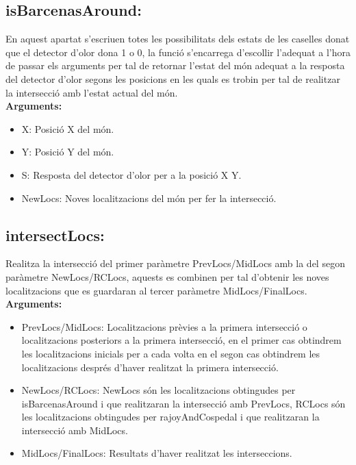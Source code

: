 \documentclass[11pt]{article}
\begin{document}
\subsection{isBarcenasAround:}
En aquest apartat s'escriuen totes les possibilitats dels estats de les caselles donat que el detector d'olor dona 1 o 0, la funció s'encarrega d'escollir l'adequat a l'hora de passar els arguments per tal de retornar l'estat del món adequat a la resposta del detector d'olor segons les posicions en les quals es trobin per tal de realitzar la intersecció amb l'estat actual del món.\\
\textbf{Arguments:}
\begin{itemize}
\item X: Posició X del món.
\item Y: Posició Y del món.
\item S: Resposta del detector d'olor per a la posició X Y.
\item NewLocs: Noves localitzacions del món per fer la intersecció.
\end{itemize}
\subsection{intersectLocs:}
Realitza la intersecció del primer paràmetre PrevLocs/MidLocs amb la del segon paràmetre NewLocs/RCLocs, aquests es combinen per tal d'obtenir les noves localitzacions que es guardaran al tercer paràmetre MidLocs/FinalLocs.\\
\textbf{Arguments:}
\begin{itemize}
\item PrevLocs/MidLocs: Localitzacions prèvies a la primera intersecció o localitzacions posteriors a la primera intersecció, en el primer cas obtindrem les localitzacions inicials per a cada volta en el segon cas obtindrem les localitzacions després d'haver realitzat la primera intersecció.
\item NewLocs/RCLocs: NewLocs són les localitzacions obtingudes per isBarcenasAround i que realitzaran la intersecció amb PrevLocs, RCLocs són les localitzacions obtingudes per rajoyAndCospedal i que realitzaran la intersecció amb MidLocs.
\item MidLocs/FinalLocs: Resultats d'haver realitzat les interseccions.
\end{itemize}
\end{document}
